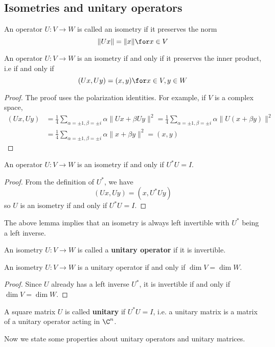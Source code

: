 \subsection{Isometries and unitary operators}
\begin{definition}
An operator $U:V\to W$ is called an isometry if it preserves the norm
\[\|Ux\|=\|x\|\for x\in V\]
\end{definition}
\begin{theorem}
An operator $U:V\to W$ is an isometry if and only if it preserves the inner product, i.e if and only if
\[(Ux,Uy)=(x,y)\for x\in V,y\in W\]
\end{theorem}
\begin{proof}
The proof uses the polarization identities. For example, if $V$ is a complex space,
\begin{align*}
(Ux,Uy)&=\frac{1}{4}\sum_{\alpha=\pm 1,\beta=\pm i}\alpha\|Ux+\beta Uy\|^2=\frac{1}{4}\sum_{\alpha=\pm 1,\beta=\pm i}\alpha\|U(x+\beta y)\|^2\\
&=\frac{1}{4}\sum_{\alpha=\pm 1,\beta=\pm i}\alpha\|x+\beta y\|^2=(x,y)
\end{align*}
\end{proof}
\begin{lemma}
An operator $U:V\to W$ is an isometry if and only if $U^*U=I$.
\end{lemma}
\begin{proof}
From the definition of $U^*$, we have
\[(Ux,Uy)=(x,U^*Uy)\]
so $U$ is an isometry if and only if $U^*U=I$.
\end{proof}
The above lemma implies that an isometry is always left invertible with $U^*$ being a left inverse.
\begin{definition}
An isometry $U:V\to W$ is called a \textbf{unitary operator} if it is invertible. 
\end{definition}
\begin{proposition}
An isometry $U:V\to W$ is a unitary operator if and only if $\dim V=\dim W$.
\end{proposition}
\begin{proof}
Since $U$ already has a left inverse $U^*$, it is invertible if and only if $\dim V=\dim W$.
\end{proof}
\begin{definition}
A square matrix $U$ is called \textbf{unitary} if $U^*U=I$, i.e. a unitary matrix is a matrix of a unitary operator acting in $\C^n$.
\end{definition}
Now we state some properties about unitary operators and unitary matrices.
